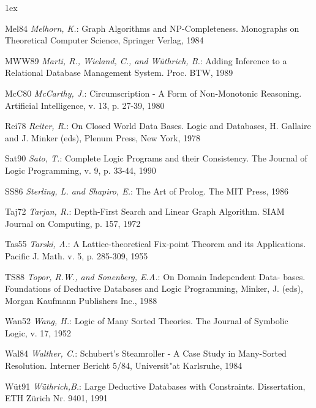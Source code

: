 \begin{list}{}{ 
\itemsep0.0cm 
\parsep1ex
\renewcommand{\makelabel}[1]{[#1]}}
\item[Mel84] {\it Melhorn, K.}: Graph Algorithms and NP-Completeness.
Monographs on Theoretical Computer Science, Springer Verlag, 1984 

\item[MWW89] {\it Marti, R., Wieland, C., and W\"uthrich, B.}: Adding Inference 
to a Relational Database Management System. Proc. BTW, 1989

\item[McC80] {\it McCarthy, J.}: Circumscription - A Form of Non-Monotonic 
Reasoning. Artificial Intelligence, v. 13, p. 27-39, 1980

\item[Rei78] {\it Reiter, R.}: On Closed World Data Bases. Logic and Databases,
H. Gallaire and J. Minker (eds), Plenum Press, New York, 1978

\item[Sat90] {\it Sato, T.}: Complete Logic Programs and their Consistency.
The Journal of Logic Programming, v. 9, p. 33-44, 1990 

\item[SS86] {\it Sterling, L. and Shapiro, E.}: The Art of Prolog.
The MIT Press, 1986

\item[Taj72] {\it Tarjan, R.}: Depth-First Search and Linear Graph Algorithm.
SIAM Journal on Computing, p. 157, 1972

\item[Tas55] {\it Tarski, A.}: A Lattice-theoretical Fix-point Theorem and 
its Applications. Pacific J. Math. v. 5, p. 285-309, 1955 

\item[TS88] {\it Topor, R.W., and Sonenberg, E.A.}: On Domain Independent Data-
bases. Foundations of Deductive Databases and Logic Programming, Minker, J. (eds), 
Morgan Kaufmann Publishers Inc., 1988

\item[Wan52] {\it Wang, H.}: Logic of Many Sorted Theories.
The Journal of Symbolic Logic, v. 17, 1952

\item[Wal84] {\it Walther, C.}: Schubert's Steamroller - A Case Study in Many-Sorted 
Resolution. Interner Bericht 5/84, Universit"at Karlsruhe, 1984

\item[W\"ut91] {\it W\"uthrich,B.}: Large Deductive Databases with Constraints. 
Dissertation, ETH Z\"urich Nr. 9401, 1991

\end{list}


